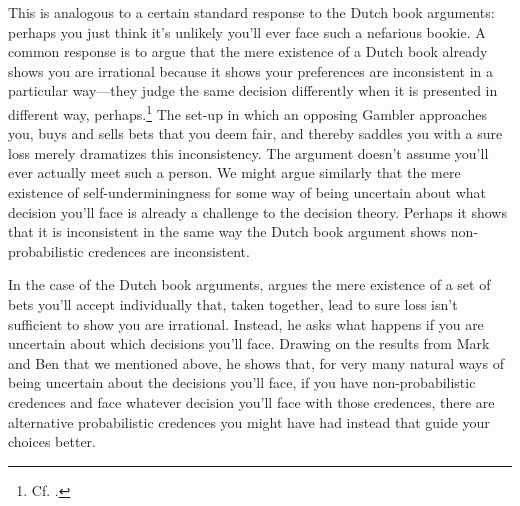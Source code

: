 \documentclass[a4paper]{article}
\newenvironment{CCM rewritten}
{\begingroup\color{blue}} %
{\endgroup}              %
\begin{document}
This is analogous to a certain standard response to the Dutch book arguments: perhaps you just think it's unlikely you'll ever face such a nefarious bookie. A common response is to argue that the mere existence of a Dutch book already shows you are irrational because it shows your preferences are inconsistent in a particular way---they judge the same decision differently when it is presented in different way, perhaps.\footnote{Cf. \citep{armendt1993db,mahtani2014db}.} %
{The set-up in which an opposing Gambler approaches you, buys and sells bets that you deem fair, and thereby saddles you with a sure loss merely dramatizes this inconsistency.} The argument doesn't assume you'll ever actually meet such a person. We might argue similarly that the mere existence of self-underminingness for some way of being uncertain about what decision you'll face is already a challenge to the decision theory. Perhaps it shows that it is inconsistent in the same way the Dutch book argument shows non-probabilistic credences are inconsistent.

In the case of the Dutch book arguments,  argues the mere existence of a set of bets you'll accept individually that, taken together, lead to sure loss isn't sufficient to show you are  irrational. Instead, he asks what happens if you are uncertain about which decisions you'll face. Drawing on the results from Mark \citet{schervish1989gm} and Ben \citet{levinstein2017pgeu} that we mentioned above, he shows that, for very  many natural ways of being uncertain about the decisions you'll face, if you have non-probabilistic credences and face whatever decision you'll face with those credences, there are alternative probabilistic credences you might have had instead that guide your choices better.
\end{document}
